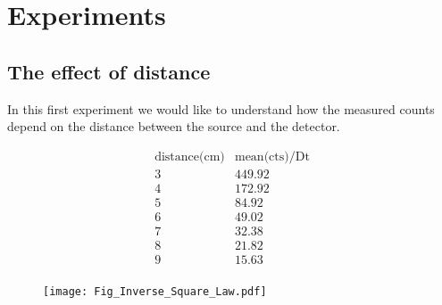 \section{Experiments}

\subsection{The effect of distance}


In this first experiment we would like to understand how the measured counts depend on the distance between the source and the detector.

\begin{displaymath}
\begin{array}{cc}
 \text{distance(cm)} & \text{mean(cts)/Dt} 
   \\
3  &  449.92   \\
4  &  172.92   \\
5  &  84.92    \\
6  &  49.02    \\
7  &  32.38    \\
8  &  21.82    \\
9  &  15.63    \\
\end{array}
\end{displaymath}

\begin{figure}
  \texttt{[image: Fig\_Inverse\_Square\_Law.pdf]}
\end{figure}



